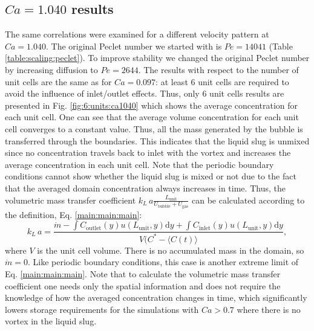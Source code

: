 \documentclass[preprint,12pt]{elsarticle}
\newcommand{\beq}{\begin{equation}}
\newcommand{\feq}{\end{equation}}
\newcommand{\vol}{k_L\,a}
\newcommand{\lunit}{L_{\mathrm{unit}}}
\newcommand{\ububble}{U_{\mathrm{bubble}}}
\newcommand{\ugas}{U_{\mathrm{gas}}}
\newcommand{\cinlet}{C_{\mathrm{inlet}}}
\newcommand{\coutlet}{C_{\mathrm{outlet}}}
\newcommand{\cstar}{C^{*}}
\newcommand{\volnondim}{\vol \frac{\lunit}{\ububble+\ugas}}
\begin{document}
\subsection{$Ca=1.040$ results}
The same correlations were examined for a different velocity pattern at $Ca=1.040$. %
The original Peclet number we started with is $Pe=14041$ (Table \ref{table:scaling:peclet}).
To improve stability we changed the original Peclet number by increasing
diffusion to $Pe=2644$. The results with respect to the number of unit cells are the same as for $Ca=0.097$:
at least $6$ unit cells are required to avoid the influence of inlet/outlet effects. Thus,
only $6$ unit cells results are presented in Fig. \ref{fig:6:units:ca1040} which shows the
average concentration for each unit cell. One can see that the average volume concentration for each unit cell converges to
a constant value. Thus, all the
mass generated by the bubble is transferred through the boundaries. This indicates that the
liquid slug is unmixed since no concentration travels back to inlet with the vortex and increases the average concentration in each unit cell. Note that the periodic boundary conditions cannot show whether the
liquid slug is mixed or not due to the fact that the averaged domain concentration always increases in time. 
Thus, the volumetric mass transfer coefficient $\volnondim$ can be calculated according to the
definition, Eq. \ref{main:main:main}:
\beq
\label{inlet:outlet:spatial:location}
\vol =
\frac{\dot{m}-\int{\coutlet(y)u(\lunit,y)\mathrm{d}y}+\int{\cinlet(y)u(\lunit,y)\mathrm{d}y}}{V
(\cstar - \langle C(t) \rangle},
\feq 
where $V$ is the unit cell volume. There is no accumulated mass in the domain, so $\dot{m}=0$. Like periodic boundary
conditions, this case is another extreme limit of Eq. \ref{main:main:main}. Note that to calculate
the volumetric mass transfer coefficient one needs only the spatial information and does not
require the knowledge of how the averaged concentration changes in time, which significantly
lowers storage requirements for the simulations with $Ca>0.7$ where there is no vortex in the
liquid slug. 
\end{document}
